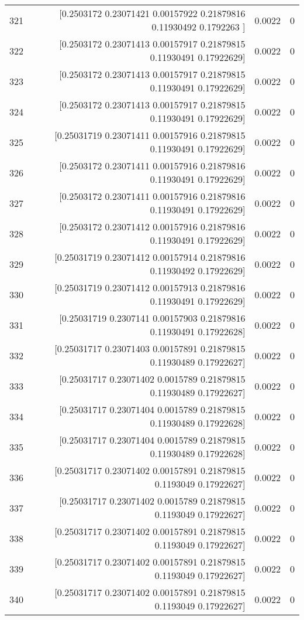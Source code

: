 \begin{longtable}{lrrr}
321 & [0.2503172  0.23071421 0.00157922 0.21879816 0.11930492 0.1792263 ] & 0.0022 & 0 \\
322 & [0.2503172  0.23071413 0.00157917 0.21879815 0.11930491 0.17922629] & 0.0022 & 0 \\
323 & [0.2503172  0.23071413 0.00157917 0.21879815 0.11930491 0.17922629] & 0.0022 & 0 \\
324 & [0.2503172  0.23071413 0.00157917 0.21879815 0.11930491 0.17922629] & 0.0022 & 0 \\
325 & [0.25031719 0.23071411 0.00157916 0.21879815 0.11930491 0.17922629] & 0.0022 & 0 \\
326 & [0.2503172  0.23071411 0.00157916 0.21879816 0.11930491 0.17922629] & 0.0022 & 0 \\
327 & [0.2503172  0.23071411 0.00157916 0.21879816 0.11930491 0.17922629] & 0.0022 & 0 \\
328 & [0.2503172  0.23071412 0.00157916 0.21879816 0.11930491 0.17922629] & 0.0022 & 0 \\
329 & [0.25031719 0.23071412 0.00157914 0.21879816 0.11930492 0.17922629] & 0.0022 & 0 \\
330 & [0.25031719 0.23071412 0.00157913 0.21879816 0.11930491 0.17922629] & 0.0022 & 0 \\
331 & [0.25031719 0.2307141  0.00157903 0.21879816 0.11930491 0.17922628] & 0.0022 & 0 \\
332 & [0.25031717 0.23071403 0.00157891 0.21879815 0.11930489 0.17922627] & 0.0022 & 0 \\
333 & [0.25031717 0.23071402 0.0015789  0.21879815 0.11930489 0.17922627] & 0.0022 & 0 \\
334 & [0.25031717 0.23071404 0.0015789  0.21879815 0.11930489 0.17922628] & 0.0022 & 0 \\
335 & [0.25031717 0.23071404 0.0015789  0.21879815 0.11930489 0.17922628] & 0.0022 & 0 \\
336 & [0.25031717 0.23071402 0.00157891 0.21879815 0.1193049  0.17922627] & 0.0022 & 0 \\
337 & [0.25031717 0.23071402 0.0015789  0.21879815 0.1193049  0.17922627] & 0.0022 & 0 \\
338 & [0.25031717 0.23071402 0.00157891 0.21879815 0.1193049  0.17922627] & 0.0022 & 0 \\
339 & [0.25031717 0.23071402 0.00157891 0.21879815 0.1193049  0.17922627] & 0.0022 & 0 \\
340 & [0.25031717 0.23071402 0.00157891 0.21879815 0.1193049  0.17922627] & 0.0022 & 0 \\

\end{longtable}
